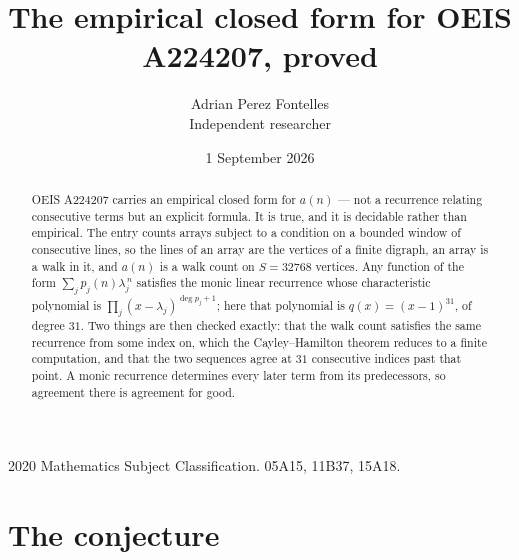 \documentclass[11pt,a4paper]{article}
\title{The empirical closed form for OEIS A224207, proved}
\author{Adrian Perez Fontelles\\ \small Independent researcher}
\date{1 September 2026}
\theoremstyle{plain}
\theoremstyle{definition}
\begin{document}
\maketitle

\begin{abstract}
OEIS A224207 carries an empirical closed form for $a(n)$ --- not a recurrence relating
consecutive terms but an explicit formula. It is true, and it is decidable rather than
empirical. The entry counts arrays subject to a condition on a bounded window of consecutive lines, so the lines of an array are the
vertices of a finite digraph, an array is a walk in it, and $a(n)$ is a walk count on
$S=32768$ vertices. Any function of the form $\sum_j p_j(n)\lambda_j^{\,n}$ satisfies the
monic linear recurrence whose characteristic polynomial is
$\prod_j(x-\lambda_j)^{\deg p_j+1}$; here that polynomial is $q(x)=(x-1)^{31}$, of degree
$31$. Two things are then checked exactly: that the walk count satisfies the same
recurrence from some index on, which the Cayley--Hamilton theorem reduces to a finite
computation, and that the two sequences agree at $31$ consecutive indices past that
point. A monic recurrence determines every later term from its predecessors, so agreement
there is agreement for good.
\end{abstract}

\noindent\small 2020 Mathematics Subject Classification. 05A15, 11B37, 15A18.\normalsize

\section{The conjecture}
\end{document}
